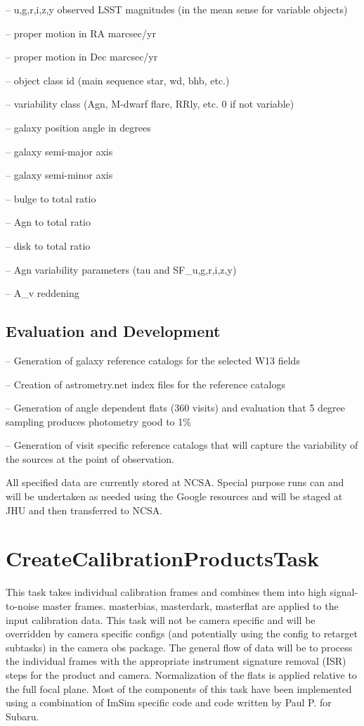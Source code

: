 \documentclass[prd, nofootinbib, floatfix, 11pt,tightenlines,times]{article}
\begin{document}
-- {u,g,r,i,z,y} observed LSST magnitudes (in the mean sense for variable objects)

-- proper motion in RA marcsec/yr

-- proper motion in Dec marcsec/yr

-- object class id (main sequence star, wd, bhb, etc.)

-- variability class (Agn, M-dwarf flare, RRly, etc.  0 if not variable)

-- galaxy position angle in degrees 

-- galaxy semi-major axis 

-- galaxy semi-minor axis

-- bulge to total ratio

-- Agn to total ratio

-- disk to total ratio

-- Agn variability parameters (tau and SF\_{u,g,r,i,z,y})

-- A\_v reddening 

\subsection{Evaluation and Development}

-- Generation of galaxy reference catalogs for the selected W13 fields

-- Creation of astrometry.net index files for the reference catalogs

-- Generation of angle dependent flats (360 visits) and evaluation
that 5 degree sampling produces photometry good to 1\%

-- Generation of visit specific reference catalogs that will capture
the  variability of the sources at the point of observation.

All specified data are currently stored at NCSA.  Special purpose runs
can and will be undertaken as needed using the Google resources and
will be staged at JHU and then transferred to NCSA.  


\section{CreateCalibrationProductsTask} 
This task takes individual calibration frames and combines them into
high signal-to-noise master frames.  masterbias, masterdark,
masterflat are applied to the input calibration data. This task will
not be camera specific and will be overridden by camera specific
configs (and potentially using the config to retarget subtasks) in the
camera obs package.  The general flow of data will be to process the
individual frames with the appropriate instrument signature removal
(ISR) steps for the product and camera.  Normalization of the flats is
applied relative to the full focal plane. Most of the components of
this task have been implemented using a combination of ImSim specific
code and code written by Paul P. for Subaru.
\end{document}
